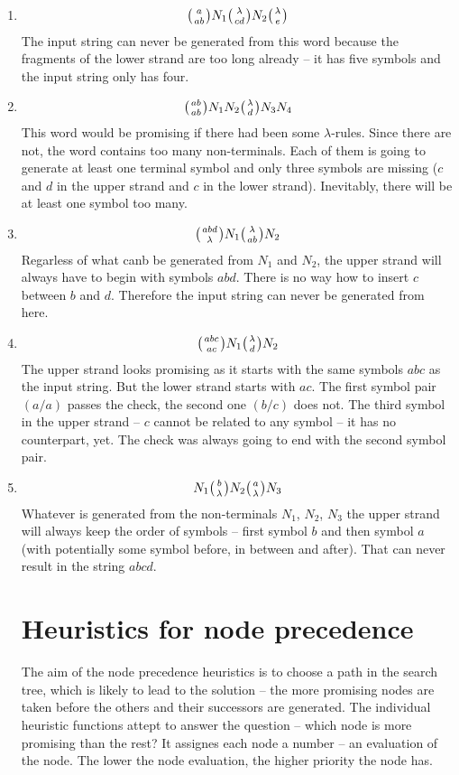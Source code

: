 \begin{enumerate}
\item{
$$\wkpair{a}{ab} N_1 \wkpair{\lambda}{cd} N_2 \wkpair{\lambda}{e}$$
The input string can never be generated from this word because the fragments of the lower strand are too long already -- it has five symbols and the input string only has four.
}
\item{
$$\wkpair{ab}{ab} N_1 N_2 \wkpair{\lambda}{d} N_3 N_4$$
This word would be promising if there had been some $\lambda$-rules. Since there are not, the word contains too many non-terminals. Each of them is going to generate at least one terminal symbol and only three symbols are missing ($c$ and $d$ in the upper strand and $c$ in the lower strand). Inevitably, there will be at least one symbol too many.
}
\item{
$$\wkpair{abd}{\lambda} N_1 \wkpair{\lambda}{ab} N_2$$
Regarless of what canb be generated from $N_1$ and $N_2$, the upper strand will always have to begin with symbols $abd$. There is no way how to insert $c$ between $b$ and $d$. Therefore the input string can never be generated from here.
}
\item{
$$\wkpair{abc}{ac} N_1 \wkpair{\lambda}{d} N_2$$
The upper strand looks promising as it starts with the same symbols $abc$ as the input string. But the lower strand starts with $ac$. The first symbol pair $(a/a)$ passes the check, the second one $(b/c)$ does not. The third symbol in the upper strand -- $c$ cannot be related to any symbol -- it has no counterpart, yet. The check was always going to end with the second symbol pair.
}
\item{
$$N_1 \wkpair{b}{\lambda} N_2 \wkpair{a}{\lambda} N_3$$
Whatever is generated from the non-terminals $N_1$, $N_2$, $N_3$ the upper strand will always keep the order of symbols -- first symbol $b$ and then symbol $a$ (with potentially some symbol before, in between and after). That can never result in the string $abcd$.
}

\section{Heuristics for node precedence} \label{heur_node_pref}

The aim of the node precedence heuristics is to choose a path in the search tree, which is likely to lead to the solution -- the more promising nodes are taken before the others and their successors are generated. The individual heuristic functions attept to answer the question -- which node is more promising than the rest? It assignes each node a number -- an evaluation of the node. The lower the node evaluation, the higher priority the node has.


\end{enumerate}
